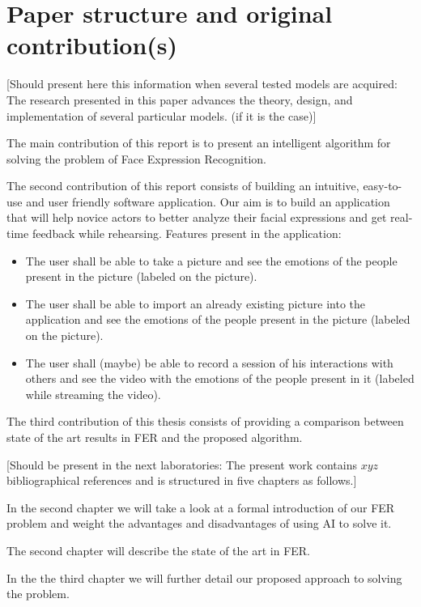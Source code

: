 \documentclass[runningheads,a4paper,11pt]{report}
\begin{document}
\section{Paper structure and original contribution(s)}
\label{section:structure}

[Should present here this information when several tested models are acquired: The research presented in this paper advances the theory, design, and implementation of several particular models. (if it is the case)]

The main contribution of this report is to present an intelligent algorithm for solving the problem of Face Expression Recognition.

The second contribution of this report consists of building an intuitive, easy-to-use and user friendly software application. Our aim is to build an application that will help novice actors to better analyze their facial expressions and get real-time feedback while rehearsing.
Features present in the application:
\begin{itemize}
	\item The user shall be able to take a picture and see the emotions of the people present in the picture (labeled on the picture).
	\item The user shall be able to import an already existing picture into the application and see the emotions of the people present in the picture (labeled on the picture).
	\item The user shall (maybe) be able to record a session of his interactions with others and see the video with the emotions of the people present in it (labeled while streaming the video).
\end{itemize}

The third contribution of this thesis consists of providing a comparison between state of the art results in FER and the proposed algorithm.

[Should be present in the next laboratories: The present work contains $xyz$ bibliographical references and is structured in five chapters as follows.]

In the second chapter we will take a look at a formal introduction of our FER problem and weight the advantages and disadvantages of using AI to solve it.

The second chapter will describe the state of the art in FER.

In the the third chapter we will further detail our proposed approach to solving the problem. 
\end{document}
